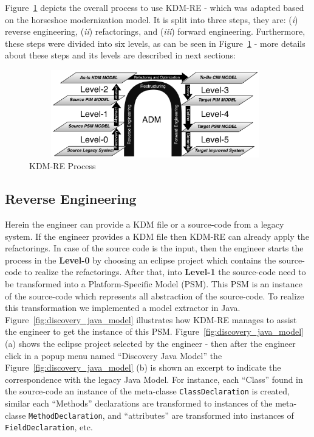 Figure~\ref{fig:process} depicts the overall process to use KDM-RE - which was adapted based on the horseshoe modernization model. 
It is split into three steps, they are: 
(\textit{i}) reverse engineering, 
(\textit{ii}) refactorings, and 
(\textit{iii}) forward engineering. 
Furthermore, these steps were divided into six levels, as can be seen in Figure~\ref{fig:process} - more details about these steps and its levels are described in next sections:

\begin{figure}[!ht]
\centering
  \includegraphics[width=11cm, height=3.8cm]{figure/processoDaFerramenta}
\caption{KDM-RE Process}
\label{fig:process}
\end{figure} 

\subsection{Reverse Engineering}

Herein the engineer can provide a KDM file or a source-code from a legacy system. If the engineer provides a KDM file then KDM-RE can already apply the refactorings. In case of the source code is the input, then the engineer starts the process in the \textbf{Level-0} by choosing an eclipse project which contains the source-code to realize the refactorings.  
After that, into \textbf{Level-1} the source-code need to be transformed into a Platform-Specific Model (PSM). 
This PSM is an instance of the source-code which represents all abstraction of the source-code. To realize this transformation we implemented a model extractor in Java. 
Figure~\ref{fig:discovery_java_model} illustrates how KDM-RE manages to assist the engineer to get the instance of this PSM. Figure~\ref{fig:discovery_java_model} (a) shows the eclipse project selected by the engineer - then after the engineer click in a popup menu named ``Discovery Java Model'' the Figure~\ref{fig:discovery_java_model} (b) is shown an excerpt to indicate the correspondence with the legacy Java Model. For instance, each ``Class'' found in the source-code an instance of the meta-classe \texttt{ClassDeclaration} is created, similar each ``Methods'' declarations are transformed to instances of the meta-classe \texttt{MethodDeclaration}, and ``attributes'' are transformed into instances of \texttt{FieldDeclaration}, etc.



